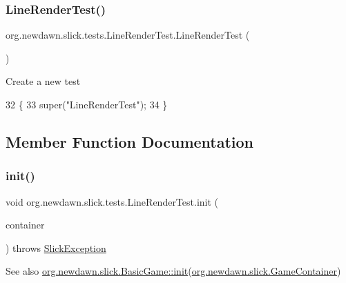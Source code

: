 \subsubsection{\texorpdfstring{Line\+Render\+Test()}{LineRenderTest()}}
{\footnotesize\ttfamily org.\+newdawn.\+slick.\+tests.\+Line\+Render\+Test.\+Line\+Render\+Test (\begin{DoxyParamCaption}{ }\end{DoxyParamCaption})\hspace{0.3cm}{\ttfamily [inline]}}

Create a new test 
\begin{DoxyCode}
32                             \{
33         super(\textcolor{stringliteral}{"LineRenderTest"});
34     \}
\end{DoxyCode}


\subsection{Member Function Documentation}
\mbox{\label{classorg_1_1newdawn_1_1slick_1_1tests_1_1_line_render_test_ad81e104460d7056367ed19a5150214b2}} 
\subsubsection{\texorpdfstring{init()}{init()}}
{\footnotesize\ttfamily void org.\+newdawn.\+slick.\+tests.\+Line\+Render\+Test.\+init (\begin{DoxyParamCaption}\item[{\mbox{\hyperlink{classorg_1_1newdawn_1_1slick_1_1_game_container}{Game\+Container}}}]{container }\end{DoxyParamCaption}) throws \mbox{\hyperlink{classorg_1_1newdawn_1_1slick_1_1_slick_exception}{Slick\+Exception}}\hspace{0.3cm}{\ttfamily [inline]}}

\begin{DoxySeeAlso}{See also}
\mbox{\hyperlink{classorg_1_1newdawn_1_1slick_1_1_basic_game_a8af0900217e4d389249f71367b22d114}{org.\+newdawn.\+slick.\+Basic\+Game\+::init}}(\mbox{\hyperlink{classorg_1_1newdawn_1_1slick_1_1_game_container}{org.\+newdawn.\+slick.\+Game\+Container}}) 
\end{DoxySeeAlso}


